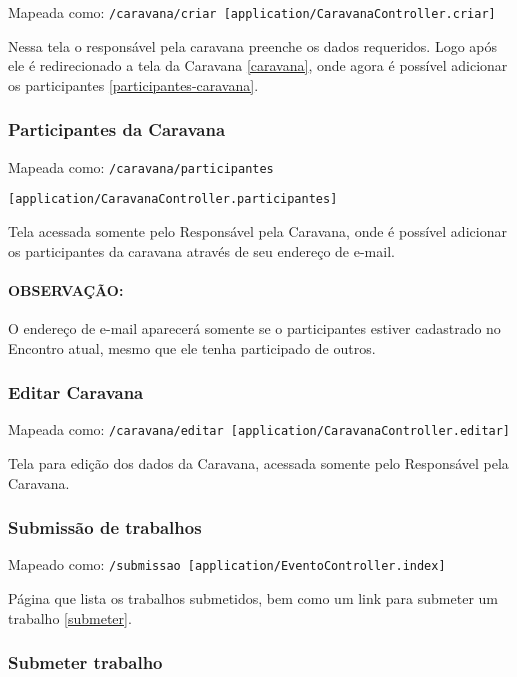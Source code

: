Mapeada como:
\texttt{/caravana/criar {[}application/CaravanaController.criar{]}}

Nessa tela o responsável pela caravana preenche os dados requeridos.
Logo após ele é redirecionado a tela da Caravana \ref{caravana}, onde
agora é possível adicionar os participantes
\ref{participantes-caravana}.

\subsubsection{Participantes da Caravana \label{participantes-caravana}}

Mapeada como: \texttt{/caravana/participantes}

\texttt{{[}application/CaravanaController.participantes{]}}

Tela acessada somente pelo Responsável pela Caravana, onde é possível
adicionar os participantes da caravana através de seu endereço de
e-mail.

\paragraph{OBSERVAÇÃO:}

O endereço de e-mail aparecerá somente se o participantes estiver
cadastrado no Encontro atual, mesmo que ele tenha participado de outros.

\subsubsection{Editar Caravana \label{editar-caravana}}

Mapeada como:
\texttt{/caravana/editar {[}application/CaravanaController.editar{]}}

Tela para edição dos dados da Caravana, acessada somente pelo
Responsável pela Caravana.

\subsubsection{Submissão de trabalhos \label{submissao}}

Mapeado como:
\texttt{/submissao {[}application/EventoController.index{]}}

Página que lista os trabalhos submetidos, bem como um link para submeter
um trabalho \ref{submeter}.

\subsubsection{Submeter trabalho \label{submeter}}

